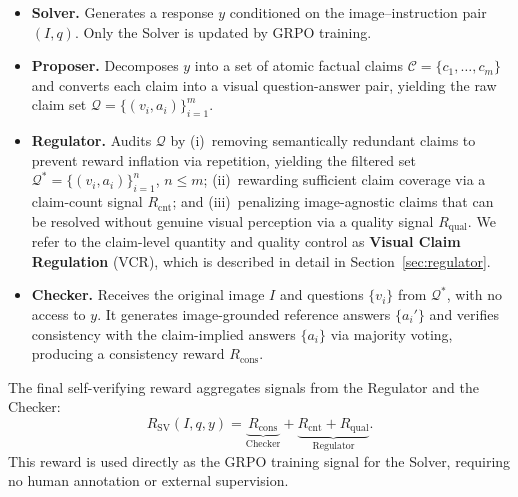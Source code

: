 \begin{itemize}[leftmargin=1em,itemsep=2pt]
\item \textbf{Solver.} Generates a response $y$ conditioned on the
    image--instruction pair $(I, q)$.
    Only the Solver is updated by GRPO training.
\item \textbf{Proposer.} Decomposes $y$ into a set of
    atomic factual claims $\mathcal{C} = \{c_1, \ldots, c_m\}$ and
    converts each claim into a visual question-answer pair, yielding the
    raw claim set $\mathcal{Q} = \{(v_i, a_i)\}_{i=1}^{m}$.
\item \textbf{Regulator.} Audits $\mathcal{Q}$ by
    (i)~removing semantically redundant claims to prevent reward inflation
    via repetition, yielding the filtered set
    $\mathcal{Q}^{\ast} = \{(v_i, a_i)\}_{i=1}^{n}$, $n \leq m$;
    (ii)~rewarding sufficient claim coverage via a claim-count signal
    $R_{\mathrm{cnt}}$; and (iii)~penalizing image-agnostic claims that
    can be resolved without genuine visual perception via a quality signal
    $R_{\mathrm{qual}}$. 
    We refer to the claim-level quantity and quality control as \textbf{Visual Claim Regulation} (VCR), which is described in detail in Section~\ref{sec:regulator}.
\item \textbf{Checker.} Receives the original image $I$ and questions $\{v_i\}$ from $\mathcal{Q}^{\ast}$, with no access to $y$.
    It generates image-grounded reference answers $\{a_i'\}$ and verifies
    consistency with the claim-implied answers $\{a_i\}$ via majority
    voting, producing a consistency reward $R_{\mathrm{cons}}$.
\end{itemize}

The final self-verifying reward aggregates signals from the Regulator and
the Checker:
\begin{equation}
    R_{\mathrm{SV}}(I, q, y)
    = \underbrace{R_{\mathrm{cons}}}_{\text{Checker}}
    + \underbrace{R_{\mathrm{cnt}} + R_{\mathrm{qual}}}_{\text{Regulator}}.
    \label{eq:reward_total}
\end{equation}
This reward is used directly as the GRPO training signal for the Solver,
requiring no human annotation or external supervision.




